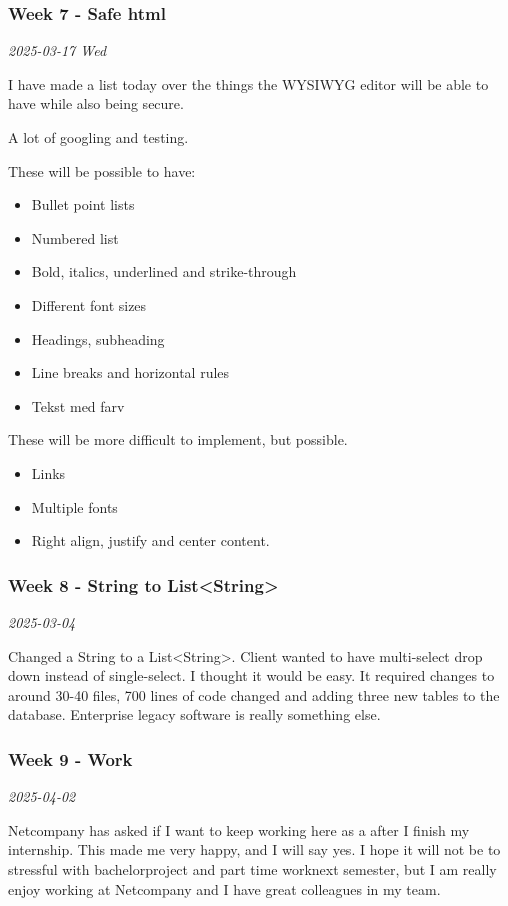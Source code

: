 \documentclass[../main.tex]{subfiles}
\begin{document}
\subsubsection{Week 7 - Safe html}
\noindent \textit{2025-03-17 Wed}
\smallskip

I have made a list today over the things the WYSIWYG editor will be able to have while also being secure. 

A lot of googling and testing. 

These will be possible to have:
\begin{itemize}
    \item Bullet point lists
    \item Numbered list
    \item Bold, italics, underlined and strike-through
    \item Different font sizes
    \item Headings, subheading
    \item Line breaks and horizontal rules
    \item Tekst med farv
\end{itemize}

These will be more difficult to implement, but possible.

\begin{itemize}
    \item Links
    \item Multiple fonts
    \item Right align, justify and center content.
\end{itemize}


\subsubsection{Week 8 - String to List<String>}
\noindent \textit{2025-03-04}
\smallskip

Changed a String to a List<String>. Client wanted to have multi-select drop down instead of single-select. I thought it would be easy. It required changes to around 30-40 files, 700 lines of code changed and adding three new tables to the database. Enterprise legacy software is really something else.

\subsubsection{Week 9 - Work}
\noindent \textit{2025-04-02}
\smallskip

Netcompany has asked if I want to keep working here as a
 after I finish my internship. This made me very
happy, and I will say yes. I hope it will not be to stressful with bachelorproject and part time worknext semester, but I am really enjoy working at Netcompany and I have great colleagues in my team. 
\end{document}
